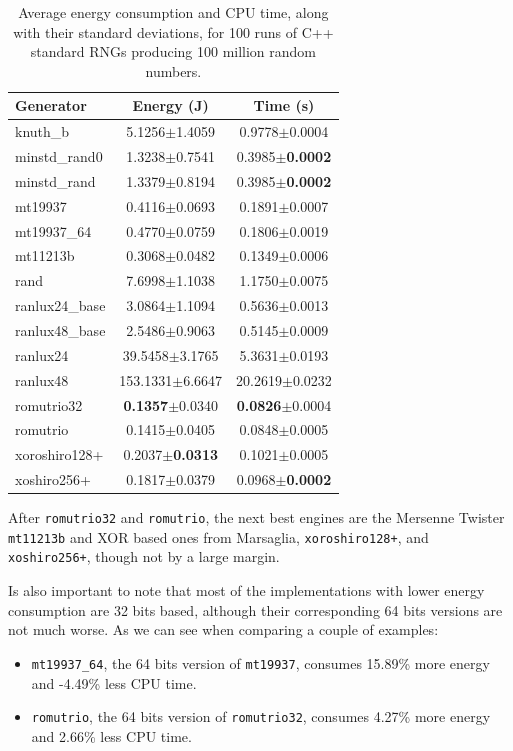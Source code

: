 \documentclass[dvipsnames,format=sigconf,anonymous=true,review=true]{acmart}
\begin{document}
\begin{table}
\centering
\caption{Average energy consumption and CPU time, along with their standard deviations, for 100 runs of C++ standard RNGs producing 100 million random numbers.}
\begin{tabular}{lcc}
\toprule
Generator & Energy (J) & Time (s) \\
\midrule
knuth\_b & 5.1256$\pm$1.4059 & 0.9778$\pm$0.0004 \\
minstd\_rand0 & 1.3238$\pm$0.7541 & 0.3985$\pm$\textbf{0.0002} \\
minstd\_rand & 1.3379$\pm$0.8194 & 0.3985$\pm$\textbf{0.0002} \\
mt19937 & 0.4116$\pm$0.0693 & 0.1891$\pm$0.0007 \\
mt19937\_64 & 0.4770$\pm$0.0759 & 0.1806$\pm$0.0019 \\
mt11213b & 0.3068$\pm$0.0482 & 0.1349$\pm$0.0006 \\
rand & 7.6998$\pm$1.1038 & 1.1750$\pm$0.0075 \\
ranlux24\_base & 3.0864$\pm$1.1094 & 0.5636$\pm$0.0013 \\
ranlux48\_base & 2.5486$\pm$0.9063 & 0.5145$\pm$0.0009 \\
ranlux24 & 39.5458$\pm$3.1765 & 5.3631$\pm$0.0193 \\
ranlux48 & 153.1331$\pm$6.6647 & 20.2619$\pm$0.0232 \\
romutrio32 & \textbf{0.1357}$\pm$0.0340 & \textbf{0.0826}$\pm$0.0004 \\
romutrio & 0.1415$\pm$0.0405 & 0.0848$\pm$0.0005 \\
xoroshiro128+ & 0.2037$\pm$\textbf{0.0313} & 0.1021$\pm$0.0005 \\
xoshiro256+ & 0.1817$\pm$0.0379 & 0.0968$\pm$\textbf{0.0002} \\
\bottomrule
\end{tabular}
\label{tab:pkg}
\end{table}

After \texttt{romutrio32} and \texttt{romutrio}, the next best engines are the Mersenne Twister \texttt{mt11213b} and XOR based ones from Marsaglia, \texttt{xoroshiro128+}, and \texttt{xoshiro256+}, though not by a large margin.

Is also important to note that most of the implementations with lower energy consumption are 32 bits based, although their corresponding 64 bits versions are not much worse. As we can see when comparing a couple of examples:
\begin{itemize}
\item \texttt{mt19937\_64}, the 64 bits version of \texttt{mt19937}, consumes 15.89\% more energy and -4.49\% less CPU time.
\item \texttt{romutrio}, the 64 bits version of \texttt{romutrio32}, consumes 4.27\% more energy and 2.66\% less CPU time.
\end{itemize}
\end{document}
